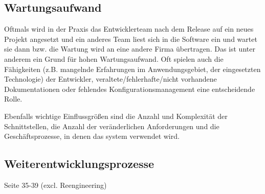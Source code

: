 \subsection{Wartungsaufwand}
Oftmals wird in der Praxis das Entwicklerteam nach dem Release auf ein neues Projekt angesetzt und ein anderes Team liest sich in die Software ein und wartet sie dann bzw. die Wartung wird an eine andere Firma übertragen. Das ist unter anderem ein Grund für hohen Wartungsaufwand. Oft spielen auch die Fähigkeiten (z.B. mangelnde Erfahrungen im Anwendungsgebiet, der eingesetzten Technologie) der Entwickler, veraltete/fehlerhafte/nicht vorhandene Dokumentationen oder fehlendes Konfigurationsmanagement eine entscheidende Rolle.

Ebenfalls wichtige Einflussgrößen sind die Anzahl und Komplexität der Schnittstellen, die Anzahl der veränderlichen Anforderungen und die Geschäftsprozesse, in denen das system verwendet wird.

\subsection{Weiterentwicklungsprozesse}
Seite 35-39  (excl. Reengineering)